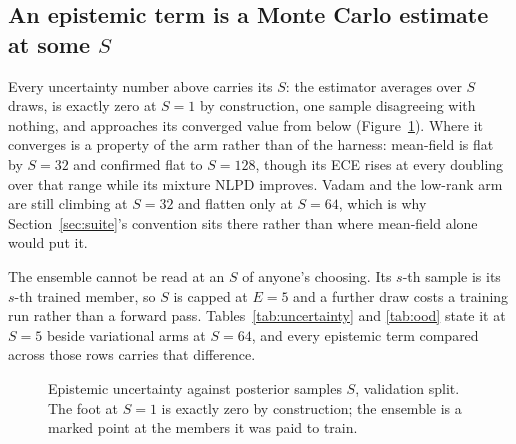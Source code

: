 \begin{table}[t]
  \centering
  
  \caption{In-distribution decomposition, in nats, by Equation~\ref{eq:decomp}. The
  worst residual against the asserted identity behind any number here is
  $4.4 \times 10^{-15}$.}
  \label{tab:uncertainty}
\end{table}

\begin{table}[t]
  \centering
  
  \caption{Epistemic uncertainty on the off-distribution stream, in nats, stated once
  per arm: the stream is one fixed synthetic sequence, so only the ratio's denominator
  is split-dependent.}
  \label{tab:ood}
\end{table}

\subsection{An epistemic term is a Monte Carlo estimate at some $S$}
\label{sec:find:s}

Every uncertainty number above carries its $S$: the estimator averages over $S$ draws,
is exactly zero at $S = 1$ by construction, one sample disagreeing with nothing, and
approaches its converged value from below (Figure~\ref{fig:s-convergence}). Where it
converges is a property of the arm rather than of the harness: mean-field is flat by
$S = 32$ and confirmed flat to $S = 128$, though its ECE rises at every doubling over
that range while its mixture NLPD improves. Vadam and the low-rank arm are still
climbing at $S = 32$ and flatten only at $S = 64$, which is why
Section~\ref{sec:suite}'s convention sits there rather than where mean-field alone
would put it.

The ensemble cannot be read at an $S$ of anyone's choosing. Its $s$-th sample is its
$s$-th trained member, so $S$ is capped at $E = 5$ and a further draw costs a training
run rather than a forward pass. Tables~\ref{tab:uncertainty} and \ref{tab:ood} state
it at $S = 5$ beside variational arms at $S = 64$, and every epistemic term compared
across those rows carries that difference.

\begin{figure}[t]
  \centering
  
  \caption{Epistemic uncertainty against posterior samples $S$, validation split. The
  foot at $S = 1$ is exactly zero by construction; the ensemble is a marked point at
  the members it was paid to train.}
  \label{fig:s-convergence}
\end{figure}

